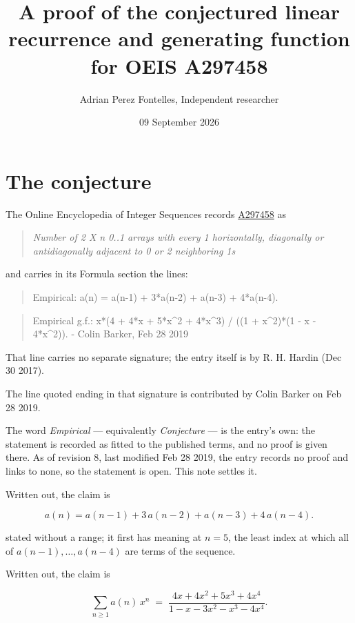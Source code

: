 \documentclass[11pt]{article}
\title{A proof of the conjectured linear recurrence and generating function for OEIS A297458}
\author{Adrian Perez Fontelles, Independent researcher}
\date{09 September 2026}
\theoremstyle{definition}
\begin{document}
\maketitle
\section{The conjecture}

The Online Encyclopedia of Integer Sequences records \href{https://oeis.org/A297458}{A297458} as

\begin{quote}\itshape Number of 2 X n 0..1 arrays with every 1 horizontally, diagonally or antidiagonally adjacent to 0 or 2 neighboring 1s\end{quote}

and carries in its Formula section the lines:

\begin{quote}\ttfamily Empirical: a(n) = a(n-1) + 3*a(n-2) + a(n-3) + 4*a(n-4).\end{quote}

\begin{quote}\ttfamily Empirical g.f.: x*(4 + 4*x + 5*x\textasciicircum{}2 + 4*x\textasciicircum{}3) / ((1 + x\textasciicircum{}2)*(1 - x - 4*x\textasciicircum{}2)). - Colin Barker, Feb 28 2019\end{quote}

That line carries no separate signature; the entry itself is by R. H. Hardin (Dec 30 2017).

The line quoted ending in that signature is contributed by Colin Barker on Feb 28 2019.

The word {\itshape Empirical} --- equivalently {\itshape Conjecture} --- is the entry's own: the statement is recorded as fitted to the published terms, and no proof is given there. As of revision 8, last modified Feb 28 2019, the entry records no proof and links to none, so the statement is open. This note settles it.

Written out, the claim is

\[a(n) = a(n-1) + 3\,a(n-2) + a(n-3) + 4\,a(n-4).\]

stated without a range; it first has meaning at $n = 5$, the least index at which all of $a(n-1),\dots,a(n-4)$ are terms of the sequence.

Written out, the claim is

\[\sum_{n \ge 1} a(n)\,x^n \;=\; \frac{4x + 4x^{2} + 5x^{3} + 4x^{4}}{1 - x - 3x^{2} - x^{3} - 4x^{4}}.\]
\end{document}
